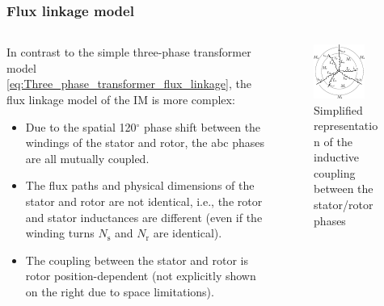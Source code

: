\begin{frame}
	\frametitle{Flux linkage model}
    \begin{columns}
		\begin{column}{0.55\textwidth}
            In contrast to the simple three-phase transformer model \eqref{eq:Three_phase_transformer_flux_linkage}, the flux linkage model of the IM is more complex: 
	       \begin{itemize}
            \item Due to the spatial 120$^\circ$ phase shift between the windings of the stator and rotor, the abc phases are all mutually coupled.
            \item The flux paths and physical dimensions of the stator and rotor are not identical, i.e., the rotor and stator inductances are different (even if the winding turns $N_\mathrm{s}$ and $N_\mathrm{r}$ are identical).
            \item The coupling between the stator and rotor is rotor position-dependent (not explicitly shown on the right due to space limitations). 
           \end{itemize}
        \end{column}
        \begin{column}{0.45\textwidth}
            \begin{figure}
                \centering
                \includegraphics[width=0.75\textwidth]{fig/lec06/Inductive_coupling_stator_rotor.pdf}
                \caption{Simplified representation of the inductive coupling between the stator/rotor phases}
                \label{fig:Simple_three_phase_induction_machine_lumped_coils}
            \end{figure}
        \end{column}
    \end{columns}
\end{frame}

